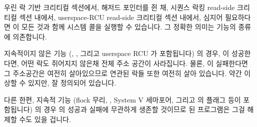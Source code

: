 우린 락 기반 크리티컬 섹션에서, 해저드 포인터를 쥔 채, 시퀀스 락킹 read-side
크리티컬 섹션 내에서, userspace-RCU read-side 크리티컬 섹션 내에서, 심지어
필요하다면 이 모든 것과 함께  시스템 콜을 실행할 수 있습니다.
그 정확한 의미는 기능의 종류에 의존합니다.

지속적이지 않은 기능 (, ,
그리고 userspace RCU 가 포함됩니다) 의 경우,  이 성공한다면, 어떤
락도 쥐어지지 않은채 전체 주소 공간이 사라집니다.
물론,  이 실패한다면 그 주소공간은 여전히 살아있으므로 연관된 락들
또한 여전히 살아 있습니다.
약간 이상할 수 있지만, 잘 정의되어 있습니다.

다른 한편, 지속적 기능 (flock 무리, , System V 세마포어, 그리고
 의  플래그 등이 포함됩니다) 의 경우  의
성공과 실패에 무관하게 생존할 것이므로  된 프로그램은 그걸 해제할
수도 있을 겁니다.

